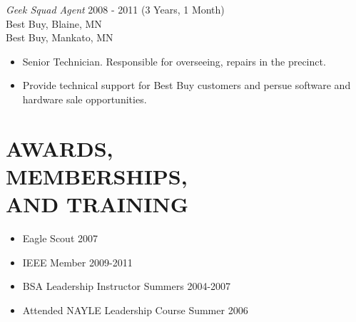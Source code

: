 \documentclass[line,margin]{res}
\begin{document}
\begin{resume}
                {\sl Geek Squad Agent} \hfill        2008 - 2011 (3 Years, 1 Month) \\
                Best Buy, Blaine, MN \\
                Best Buy, Mankato, MN 
                \begin{itemize}  \itemsep -2pt %
                \item Senior Technician. Responsible for overseeing, 
                    repairs in the precinct. 
                \item Provide technical support for Best Buy customers
		    and persue software and hardware sale opportunities.
                \end{itemize} 

\section{AWARDS, \\ MEMBERSHIPS, \\ AND TRAINING}
            	\begin{itemize}  \itemsep -2pt %
                \item Eagle Scout \hfill 2007
            	\item IEEE Member \hfill 2009-2011
            	\item BSA Leadership Instructor \hfill Summers 2004-2007
            	\item Attended NAYLE Leadership Course \hfill Summer 2006
                \end{itemize}


\end{resume}
\end{document}
